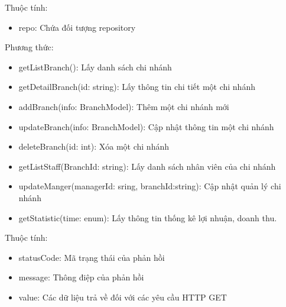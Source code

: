 Thuộc tính:
\begin{itemize}
	\item repo: Chứa đối tượng repository
\end{itemize}
Phương thức:
\begin{itemize}
	\item getListBranch(): Lấy danh sách chi nhánh
	\item getDetailBranch(id: string): Lấy thông tin chi tiết một chi nhánh
	\item addBranch(info: BranchModel): Thêm một chi nhánh mới
	\item updateBranch(info: BranchModel): Cập nhật thông tin một chi nhánh
	\item deleteBranch(id: int): Xóa một chi nhánh
	\item getListStaff(BranchId: string): Lấy danh sách nhân viên của chi nhánh
	\item updateManger(managerId: sring, branchId:string): Cập nhật quản lý chi nhánh
	\item getStatistic(time: enum): Lấy thông tin thống kê lợi nhuận, doanh thu.
\end{itemize}

Thuộc tính:
\begin{itemize}
	\item statusCode: Mã trạng thái của phản hồi
	\item message: Thông điệp của phản hồi
	\item value: Các dữ liệu trả về đối với các yêu cầu HTTP GET
\end{itemize}


